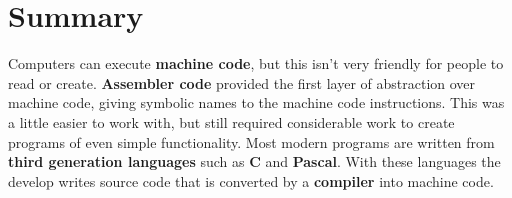 
\section{Summary} %
\label{sec:summary-compilers}

Computers can execute \textbf{machine code}, but this isn't very friendly for people to read or create. \textbf{Assembler code} provided the first layer of abstraction over machine code, giving symbolic names to the machine code instructions. This was a little easier to work with, but still required considerable work to create programs of even simple functionality. Most modern programs are written from \textbf{third generation languages} such as \textbf{C} and \textbf{Pascal}. With these languages the develop writes source code that is converted by a \textbf{compiler} into machine code.


